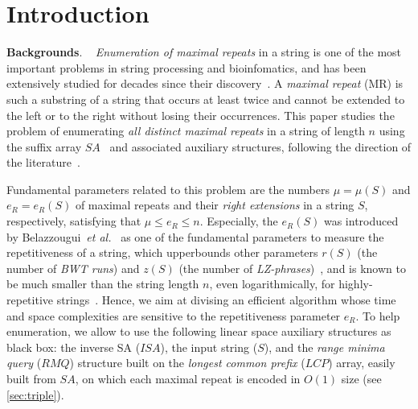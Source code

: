 
\section{Introduction}
\label{sec:intro}
\textbf{Backgrounds}. \ 
\textit{Enumeration of maximal repeats} in a string is one of the most important problems in string processing and bioinfomatics, and has been extensively studied for decades since their discovery~\cite{blumer1987complete,crochemore:verin1997compact,raffinot2001maximal}. 
A \textit{maximal repeat} (MR) is such a substring of a string that occurs at least twice and cannot be extended to the left or to the right without losing their occurrences. 
This paper studies the problem of enumerating \textit{all distinct maximal repeats} in a string of length $n$ using the suffix array $SA$~\cite{manber:myers1993suffixarrays} and associated auxiliary structures, following the direction of the literature~\cite{narisawa2007efficient,okanohara2009text,beller:berger2012space:efficient:bbo,belazzougui2020linear,nishimoto:cpm2021enum}.

Fundamental parameters related to this problem are the numbers $\mu = \mu(S)$ and $e_R = e_R(S)$ of maximal repeats and their \textit{right extensions} in a string $S$, respectively, satisfying that $\mu \le e_R\le n$.
Especially, the $e_R(S)$ was introduced by Belazzougui~\textit{et al.}~\cite{belazzougui:cunial:gagie:prezza:raffinot2015composite} as one of the fundamental parameters to measure the repetitiveness of a string, which upperbounds other parameters $r(S)$ (the number of \textit{BWT runs}) and $z(S)$ (the number of \textit{LZ-phrases})~\cite{belazzougui:cunial:gagie:prezza:raffinot2015composite}, and is known to be much smaller than the string length $n$, even logarithmically, for highly-repetitive strings~\cite{radoszewski:rytter2012structure:cdawg:thuemorse}. Hence, we aim at divising an efficient algorithm whose time and space complexities are sensitive to the repetitiveness parameter $e_R$. 
To help enumeration, we allow to use the following linear space auxiliary structures as black box: the inverse SA ($ISA$), the input string ($S$), and the \textit{range minima query} ($RMQ$) structure built on the \textit{longest common prefix} ($LCP$) array, easily built from $SA$, on which each maximal repeat is encoded in $O(1)$ size (see \cref{sec:triple}). 

